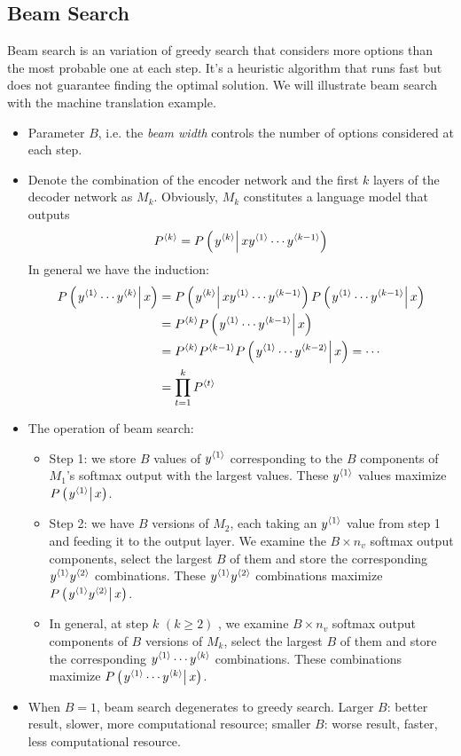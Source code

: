 \subsection{Beam Search}
Beam search is an variation of greedy search that considers more options than the most probable one at each step. It's a heuristic algorithm that runs fast but does not guarantee finding the optimal solution. We will illustrate beam search with the machine translation example.
\begin{itemize}
  \item Parameter $B$, i.e. the \textit{beam width} controls the number of options considered at each step. 
  \item Denote the combination of the encoder network and the first $k$ layers of the decoder network as $M_k$. Obviously, $M_k$ constitutes a language model that outputs
\[P^{\left\langle k\right\rangle}=P\left(\left.y^{\left\langle k\right\rangle}\right\vert xy^{\left\langle 1\right\rangle}\cdots y^{\left\langle k-1\right\rangle}\right)\]
  In general we have the induction:
  \begin{align*}
    P\left(\left.y^{\left\langle 1\right\rangle}\cdots y^{\left\langle k\right\rangle}\right\vert x\right)&=P\left(\left.y^{\left\langle k\right\rangle}\right\vert xy^{\left\langle 1\right\rangle}\cdots y^{\left\langle k-1\right\rangle}\right)P\left(\left.y^{\left\langle 1\right\rangle}\cdots y^{\left\langle k-1\right\rangle}\right\vert x\right)\\
    &=P^{\left\langle k\right\rangle}P\left(\left.y^{\left\langle 1\right\rangle}\cdots y^{\left\langle k-1\right\rangle}\right\vert x\right)\\
    &=P^{\left\langle k\right\rangle}P^{\left\langle k-1\right\rangle}P\left(\left.y^{\left\langle 1\right\rangle}\cdots y^{\left\langle k-2\right\rangle}\right\vert x\right)=\cdots\\
    &=\displaystyle\prod_{t=1}^kP^{\left\langle t\right\rangle}
  \end{align*}
  \item The operation of beam search:
  \begin{itemize}
    \item Step 1: we store $B$ values of $y^{\left\langle 1\right\rangle}$ corresponding to the $B$ components of $M_1$'s softmax output with the largest values. These $y^{\left\langle 1\right\rangle}$ values maximize $P\left(\left.y^{\left\langle 1\right\rangle}\right\vert x\right)$. 
    \item Step 2: we have $B$ versions of $M_2$, each taking an $y^{\left\langle 1\right\rangle}$ value from step 1 and feeding it to the output layer. We examine the $B\times n_v$ softmax output components, select the largest $B$ of them and store the corresponding $y^{\left\langle 1\right\rangle}y^{\left\langle 2\right\rangle}$ combinations. These $y^{\left\langle 1\right\rangle}y^{\left\langle 2\right\rangle}$ combinations maximize $P\left(\left.y^{\left\langle 1\right\rangle}y^{\left\langle 2\right\rangle}\right\vert x\right)$.
    \item In general, at step $k$ $(k\ge 2)$ , we examine $B\times n_v$ softmax output components of $B$ versions of $M_k$, select the largest $B$ of them and store the corresponding $y^{\left\langle 1\right\rangle}\cdots y^{\left\langle k\right\rangle}$ combinations. These combinations maximize $P\left(\left.y^{\left\langle 1\right\rangle}\cdots y^{\left\langle k\right\rangle}\right\vert x\right)$.
  \end{itemize}
  \item When $B=1$, beam search degenerates to greedy search. Larger $B$: better result, slower, more computational resource; smaller $B$: worse result, faster, less computational resource.
\end{itemize}
